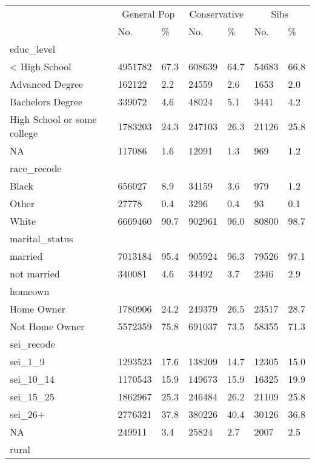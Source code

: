 \captionsetup[table]{labelformat=empty,skip=1pt}
\begin{longtable}{lllllll}
\toprule
& \multicolumn{2}{c}{General Pop} & \multicolumn{2}{c}{Conservative} & \multicolumn{2}{c}{Sibs} \\ 
 \cmidrule(lr){2-3}\cmidrule(lr){4-5}\cmidrule(lr){6-7}
 & No. & \% & No. & \% & No. & \% \\ 
\midrule
\multicolumn{1}{l}{educ\_level} \\ 
\midrule
< High School & 4951782 & 67.3 & 608639 & 64.7 & 54683 & 66.8 \\ 
Advanced Degree & 162122 & 2.2 & 24559 & 2.6 & 1653 & 2.0 \\ 
Bachelors Degree & 339072 & 4.6 & 48024 & 5.1 & 3441 & 4.2 \\ 
High School or some college & 1783203 & 24.3 & 247103 & 26.3 & 21126 & 25.8 \\ 
NA & 117086 & 1.6 & 12091 & 1.3 & 969 & 1.2 \\ 
\midrule
\multicolumn{1}{l}{race\_recode} \\ 
\midrule
Black & 656027 & 8.9 & 34159 & 3.6 & 979 & 1.2 \\ 
Other & 27778 & 0.4 & 3296 & 0.4 & 93 & 0.1 \\ 
White & 6669460 & 90.7 & 902961 & 96.0 & 80800 & 98.7 \\ 
\midrule
\multicolumn{1}{l}{marital\_status} \\ 
\midrule
married & 7013184 & 95.4 & 905924 & 96.3 & 79526 & 97.1 \\ 
not married & 340081 & 4.6 & 34492 & 3.7 & 2346 & 2.9 \\ 
\midrule
\multicolumn{1}{l}{homeown} \\ 
\midrule
Home Owner & 1780906 & 24.2 & 249379 & 26.5 & 23517 & 28.7 \\ 
Not Home Owner & 5572359 & 75.8 & 691037 & 73.5 & 58355 & 71.3 \\ 
\midrule
\multicolumn{1}{l}{sei\_recode} \\ 
\midrule
sei\_1\_9 & 1293523 & 17.6 & 138209 & 14.7 & 12305 & 15.0 \\ 
sei\_10\_14 & 1170543 & 15.9 & 149673 & 15.9 & 16325 & 19.9 \\ 
sei\_15\_25 & 1862967 & 25.3 & 246484 & 26.2 & 21109 & 25.8 \\ 
sei\_26+ & 2776321 & 37.8 & 380226 & 40.4 & 30126 & 36.8 \\ 
NA & 249911 & 3.4 & 25824 & 2.7 & 2007 & 2.5 \\ 
\midrule
\multicolumn{1}{l}{rural} \\ 

\end{longtable}
